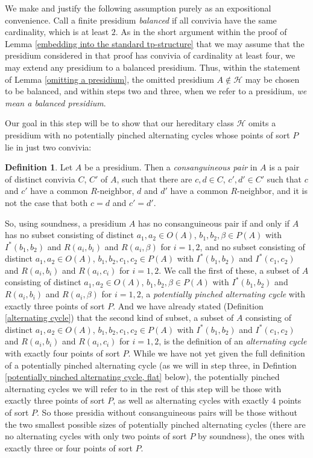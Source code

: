 \documentclass{amsart}
\theoremstyle{definition}
\newtheorem{definition}[theorem]{Definition}
\theoremstyle{remark}
\numberwithin{equation}{section}
\begin{document}
We make and justify the following assumption purely as an expositional convenience. Call a finite presidium \textit{balanced} if all convivia have the same cardinality, which is at least $2$. As in the short argument within the proof of Lemma \ref{embedding into the standard tp-structure} that we may assume that the presidium considered in that proof has convivia of cardinality at least four, we may extend any presidium to a balanced presidium. Thus, within the statement of Lemma \ref{omitting a presidium}, the omitted presidium $A \notin \mathcal{H}$ may be chosen to be balanced, and within steps two and three, when we refer to a presidium, \textit{we mean a balanced presidium}.


Our goal in this step will be to show that our hereditary class $\mathcal{H}$ omits a presidium with no potentially pinched alternating cycles whose points of sort $P$ lie in just two convivia:


\begin{definition}
    \label{consanguineous pair} Let $A$ be a presidium. Then a \textit{consanguineous pair} in $A$ is a pair of distinct convivia $C$, $C'$ of $A$, such that there are $c, d \in C$, $c', d' \in C'$ such that $c$ and $c'$ have a common $R$-neighbor, $d$ and $d'$ have a common $R$-neighbor, and it is not the case that both $c = d$  and $c' = d'$.
\end{definition}

So, using soundness, a presidium $A$ has no consanguineous pair if and only if $A$ has no subset consisting of distinct $a_1, a_2 \in O(A)$, $b_1, b_2, \beta \in P(A)$ with $I^{*}(b_1, b_2)$ and $R(a_{i}, b_{i})$ and $R(a_i, \beta)$ for $i = 1, 2$, and no subset consisting of distinct $a_1, a_2 \in O(A)$, $b_1, b_2, c_1, c_2 \in P(A)$ with $I^{*}(b_1, b_2)$ and $I^{*}(c_1, c_2)$ and $R(a_{i}, b_{i})$ and $R(a_i, c_i)$ for $i = 1, 2$.  We call the first of these, a subset of $A$ consisting of distinct $a_1, a_2 \in O(A)$, $b_1, b_2, \beta \in P(A)$ with $I^{*}(b_1, b_2)$ and $R(a_{i}, b_{i})$ and $R(a_i, \beta)$ for $i = 1, 2$, a \textit{potentially pinched alternating cycle} with exactly three points of sort $P$. And we have already stated (Definition \ref{alternating cycle}) that the second kind of subset, a subset of $A$ consisting of distinct $a_1, a_2 \in O(A)$, $b_1, b_2, c_1, c_2 \in P(A)$ with $I^{*}(b_1, b_2)$ and $I^{*}(c_1, c_2)$ and $R(a_{i}, b_{i})$ and $R(a_i, c_i)$ for $i = 1, 2$, is the definition of an \textit{alternating cycle} with exactly four points of sort $P$. While we have not yet given the full definition of a potentially pinched alternating cycle (as we will in step three, in Defintion \ref{potentially pinched alternating cycle, flat} below), the potentially pinched alternating cycles we will refer to in the rest of this step will be those with exactly three points of sort $P$, as well as alternating cycles with exactly $4$ points of sort $P$. So those presidia without consanguineous pairs will be those without the two smallest possible sizes of potentially pinched alternating cycles (there are no alternating cycles with only two points of sort $P$ by soundness), the ones with exactly three or four points of sort $P$.
\end{document}
